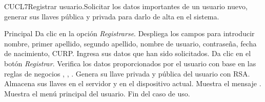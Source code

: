 
\begin{UseCase}{CUCL7}{Registrar usuario.}{Solicitar los datos importantes de un usuario nuevo, generar sus llaves pública y privada para darlo de alta en el sistema.
	}
\end{UseCase}


\begin{UCtrayectoria}{Principal}
	\UCpaso[\UCactor] Da clic en la opción \textit{Registrarse}.
	\UCpaso Despliega los campos para introducir nombre, primer apellido, segundo apellido, nombre de usuario, contraseña, fecha de nacimiento, CURP.
	\UCpaso[\UCactor] Ingresa sus datos que han sido solicitados. \label{CUCL7Regresa}  
	\UCpaso[\UCactor] Da clic en el botón \textit{Registrar}.
	\UCpaso Verifica los datos proporcionados por el usuario con base en las reglas de negocios ,  ,  .        
	\UCpaso Genera su llave privada y pública del usuario con RSA. 
	\UCpaso Almacena sus llaves en el servidor y en el dispositivo actual.
	\UCpaso Muestra el mensaje . 
	\UCpaso Muestra el menú principal del usuario.
	\UCpaso Fin del caso de uso.
\end{UCtrayectoria}


